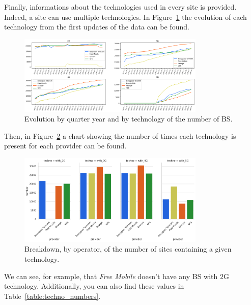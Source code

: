 \documentclass[lettersize,journal,english]{IEEEtran}
\begin{document}
        Finally, informations about the technologies used in every site is provided. Indeed, a site can use multiple technologies.
        In Figure~\ref{fig:data_evolution} the evolution of each technology from the first updates of the data can be found.
        \begin{figure}
            \centering
            \includegraphics[width=3.5in]{images/data_analysis/technos-evolution.png}
            \caption{Evolution by quarter year and by technology of the number of BS.}
            \label{fig:data_evolution}
        \end{figure}
        Then, in Figure~\ref{fig:data_technos} a chart showing the number of times each technology is present for each provider can be found.
        \begin{figure}
            \centering
            \includegraphics[width=3.5in]{images/data_analysis/with_techno.png}
            \caption{Breakdown, by operator, of the number of sites containing a given technology.}
            \label{fig:data_technos}
        \end{figure}
        We can see, for example, that \emph{Free Mobile} doesn't have any BS with $2$G technology. Additionally, you can also find these values in Table~\ref{table:techno_numbers}.
\end{document}
